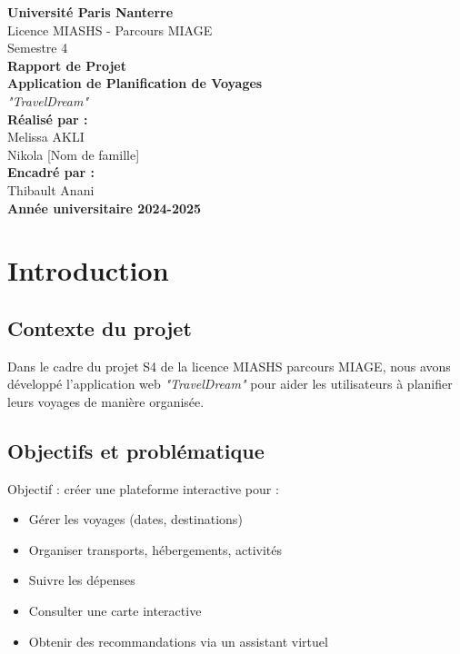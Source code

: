 \documentclass[a4paper,12pt]{article}
\begin{document}
\begin{titlepage}
    \centering
    {\Large \textbf{Université Paris Nanterre}}\\[0.5cm]
    {\large Licence MIASHS - Parcours MIAGE}\\[0.2cm]
    {\large Semestre 4}\\[2cm]

    {\huge \textbf{Rapport de Projet}}\\[0.5cm]
    {\LARGE \textbf{Application de Planification de Voyages}}\\[0.5cm]
    {\LARGE \textit{"TravelDream"}}\\[2cm]

    \textbf{Réalisé par :}\\
    Melissa AKLI \\
    Nikola [Nom de famille] \\[0.5cm]

    \textbf{Encadré par :}\\
    Thibault Anani \\[2cm]

    \vfill
    \textbf{Année universitaire 2024-2025}
\end{titlepage}

\newpage
\tableofcontents
\newpage

\section{Introduction}

\subsection{Contexte du projet}
Dans le cadre du projet S4 de la licence MIASHS parcours MIAGE, nous avons développé l’application web \textit{"TravelDream"} pour aider les utilisateurs à planifier leurs voyages de manière organisée.

\subsection{Objectifs et problématique}
Objectif : créer une plateforme interactive pour :
\begin{itemize}
    \item Gérer les voyages (dates, destinations)
    \item Organiser transports, hébergements, activités
    \item Suivre les dépenses
    \item Consulter une carte interactive
    \item Obtenir des recommandations via un assistant virtuel
\end{itemize}
\end{document}
